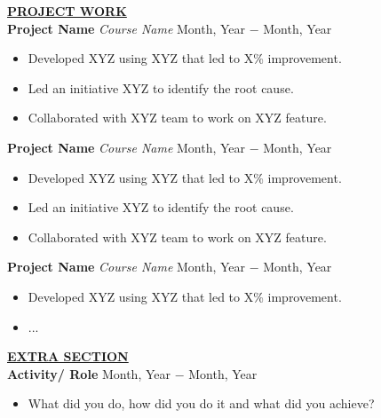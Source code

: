 \documentclass{article}
\begin{document}
	\noindent \textbf{\underline{PROJECT WORK}} \\
	\noindent \textbf{Project Name} \textit{Course Name} \hfill  Month, Year $-$ Month, Year
	\begin{itemize}[noitemsep,nolistsep,leftmargin=*]
		\item {Developed XYZ using XYZ that led to X\% improvement.}
		\item {Led an initiative XYZ to identify the root cause.}
		\item {Collaborated with XYZ team to work on XYZ feature. \\}
	\end{itemize}
	
	\noindent \textbf{Project Name} \textit{Course Name} \hfill  Month, Year $-$ Month, Year
	\begin{itemize}[noitemsep,nolistsep,leftmargin=*]
		\item {Developed XYZ using XYZ that led to X\% improvement.}
		\item {Led an initiative XYZ to identify the root cause.}
		\item {Collaborated with XYZ team to work on XYZ feature. \\}
	\end{itemize}
	
	\noindent \textbf{Project Name} \textit{Course Name} \hfill  Month, Year $-$ Month, Year
	\begin{itemize}[noitemsep,nolistsep,leftmargin=*]
		\item {Developed XYZ using XYZ that led to X\% improvement.}
		\item {... \\}
	\end{itemize}
	
	\noindent \textbf{\underline{EXTRA SECTION}} \\
	\noindent \textbf{Activity/ Role} \hfill Month, Year $-$ Month, Year
	\begin{itemize}[noitemsep,nolistsep,leftmargin=*]
		\item {What did you do, how did you do it and what did you achieve? \\}
	\end{itemize}
	
\end{document}
